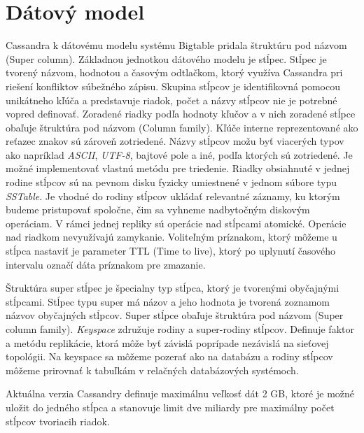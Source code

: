 \documentclass[11pt,twoside,a4paper]{book}
\begin{document}
\section{Dátový model}
Cassandra k dátovému modelu systému Bigtable pridala štruktúru pod názvom \emph{} (Super column). Základnou jednotkou dátového modelu je stĺpec. Stĺpec je tvorený názvom, hodnotou a časovým odtlačkom, ktorý využíva Cassandra pri riešení konfliktov súbežného zápisu. Skupina stĺpcov je identifikovná pomocou unikátneho kľúča a predstavuje riadok, počet a názvy stĺpcov nie je potrebné vopred definovať. Zoradené riadky podľa hodnoty kľučov a v nich zoradené stĺpce obaľuje štruktúra pod názvom \emph{} (Column family). Kľúče interne reprezentované ako reťazec znakov sú zároveň zotriedené. Názvy stĺpcov možu byť viacerých typov ako napríklad \emph{ASCII}, \emph{UTF-8}, bajtové pole a iné, podľa ktorých sú zotriedené. Je možné implementovať vlastnú metódu pre triedenie. Riadky obsiahnuté v jednej rodine stĺpcov sú na pevnom disku fyzicky umiestnené v jednom súbore typu \emph{SSTable}. Je vhodné do rodiny stĺpcov ukládať relevantné záznamy, ku ktorým budeme pristupovať spoločne, čim sa vyhneme nadbytočným diskovým operáciam. V rámci jednej repliky sú operácie nad stĺpcami atomické. Operácie nad riadkom nevyužívajú zamykanie. Voliteľným príznakom, ktorý môžeme u stĺpca nastaviť je parameter TTL (Time to live), ktorý po uplynutí časového intervalu označí dáta príznakom pre zmazanie.

Štruktúra super stĺpec je špecialny typ stĺpca, ktorý je tvorenými obyčajnými stĺpcami. Stĺpec typu super má názov a jeho hodnota je tvorená zoznamom názvov obyčajných stĺpcov. Super stĺpce obaľuje štruktúra pod názvom \emph{} (Super column family). \emph{Keyspace} združuje rodiny a super-rodiny stĺpcov. Definuje faktor a metódu replikácie, ktorá môže byť závislá poprípade nezávislá na sieťovej topológii. Na keyspace sa môžeme pozerať ako na databázu a rodiny stĺpcov môžeme prirovnať k tabuľkám v relačných databázových systémoch.

Aktuálna verzia Cassandry definuje maximálnu veľkosť dát 2 GB, ktoré je možné uložit do jedného stĺpca a stanovuje limit dve miliardy pre maximálny počet stĺpcov tvoriacih riadok.

\end{document}
